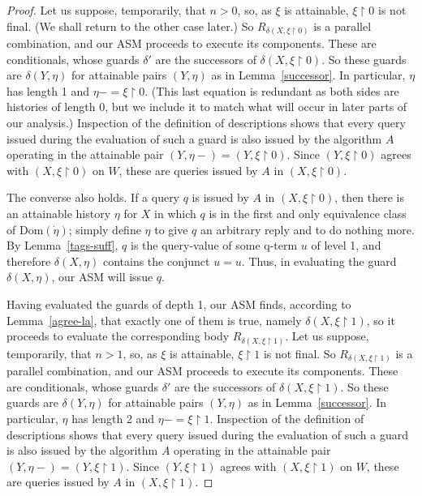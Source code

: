 \documentclass{LMCS}
\theoremstyle{definition}
\newcommand{\ans}{\dot}
\newcommand{\dom}[1]{\ensuremath{{\text{Dom}}(#1)}}
\newcommand{\restr}{\mathop{\upharpoonright}}
\begin{document}
\begin{proof}
Let us suppose, temporarily, that $n>0$, so, as $\xi$ is attainable,
$\xi\restr0$ is not final.  (We shall return to the other case later.)
So $R_{\delta(X,\xi\restr0)}$ is a parallel combination, and our ASM
proceeds to execute its components.  These are conditionals, whose
guards $\delta'$ are the successors of $\delta(X,\xi\restr0)$.  So
these guards are $\delta(Y,\eta)$ for attainable pairs $(Y,\eta)$ as in
Lemma~\ref{successor}.  In particular, $\eta$ has length 1 and
$\eta-=\xi\restr0$.  (This last equation is redundant as both sides
are histories of length 0, but we include it to match what will occur
in later parts of our analysis.)  Inspection of the definition of
descriptions shows that every query issued during the evaluation of
such a guard is also issued by the algorithm $A$ operating in the
attainable pair $(Y,\eta-)=(Y,\xi\restr0)$.  Since $(Y,\xi\restr0)$
agrees with $(X,\xi\restr0)$ on $W$, these are queries issued by $A$
in $(X,\xi\restr0)$.

The converse also holds.  If a query $q$ is issued by $A$ in
$(X,\xi\restr0)$, then there is an attainable history $\eta$ for
$X$ in which $q$ is in the first and only equivalence class of
$\dom{\ans\eta}$; simply define $\eta$ to give $q$ an arbitrary reply
and to do nothing more.  By Lemma~\ref{tags-suff}, $q$ is the
query-value of some q-term $u$ of level 1, and therefore
$\delta(X,\eta)$ contains the conjunct $u=u$.  Thus, in evaluating
the guard $\delta(X,\eta)$, our ASM will issue $q$.

Having evaluated the guards of depth 1, our ASM finds, according to
Lemma~\ref{agree-la}, that exactly one of them is true, namely
$\delta(X,\xi\restr1)$, so it proceeds to evaluate the corresponding
body $R_{\delta(X,\xi\restr1)}$.  Let us suppose, temporarily, that
$n>1$, so, as $\xi$ is attainable, $\xi\restr1$ is not final.  So
$R_{\delta(X,\xi\restr1)}$ is a parallel combination, and our ASM
proceeds to execute its components.  These are conditionals, whose
guards $\delta'$ are the successors of $\delta(X,\xi\restr1)$.  So
these guards are $\delta(Y,\eta)$ for attainable pairs $(Y,\eta)$ as
in Lemma~\ref{successor}.  In particular, $\eta$ has length 2 and
$\eta-=\xi\restr1$.  Inspection of the definition of descriptions
shows that every query issued during the evaluation of such a guard is
also issued by the algorithm $A$ operating in the attainable pair
$(Y,\eta-)=(Y,\xi\restr1)$.  Since $(Y,\xi\restr1)$ agrees with
$(X,\xi\restr1)$ on $W$, these are queries issued by $A$ in
$(X,\xi\restr1)$.


\end{proof}
\end{document}

